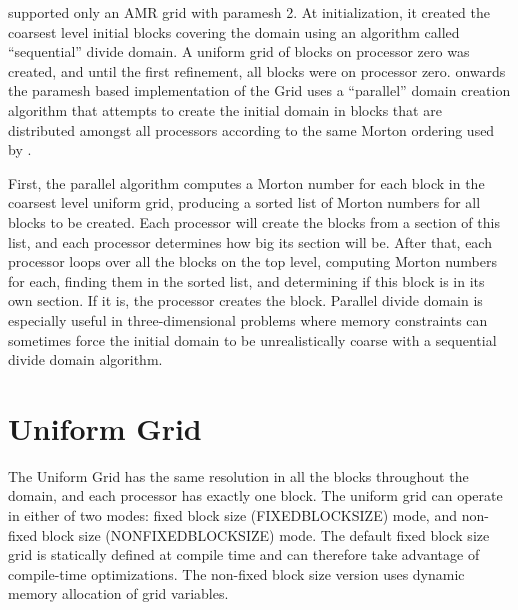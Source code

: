 \begin{flashtip}
\flashx supported only an AMR grid with paramesh 2.  At initialization, it
created the coarsest level initial blocks
covering the domain using an algorithm called ``sequential'' divide domain.
A uniform grid of blocks on processor zero was created, and until the
first refinement, all blocks were on processor zero.  \flashx onwards
the paramesh based implementation of the Grid uses a ``parallel''
domain creation algorithm that attempts to create the initial domain
in blocks that are distributed amongst all processors according to the
same Morton ordering used by \Paramesh. 

First, the parallel algorithm computes a Morton number for each block
in the coarsest level uniform grid, producing a sorted list of Morton
numbers for all blocks to be created.  Each processor will create the
blocks from a section of this list, and each processor determines how
big its section will be.  After that, each processor loops over all
the blocks on the top level, computing Morton numbers for each,
finding them in the sorted list, and determining if this block is in
its own section.  If it is, the processor creates the block. Parallel
divide domain is especially useful in three-dimensional problems where
memory constraints can sometimes force the initial domain to be
unrealistically coarse with a sequential divide domain
algorithm. 
\end{flashtip} 


 

\section{Uniform Grid} 
\label{Sec:Grid UG} 

The Uniform Grid has the same resolution in all the blocks throughout
the domain, and each processor has exactly one block.  The uniform
grid can operate in either of two modes: fixed block size
(FIXEDBLOCKSIZE) mode, and non-fixed block size (NONFIXEDBLOCKSIZE)
mode. The default fixed block size grid is statically defined at
compile time and can therefore take advantage of compile-time
optimizations. The non-fixed block size version uses dynamic memory
allocation of grid variables. 

